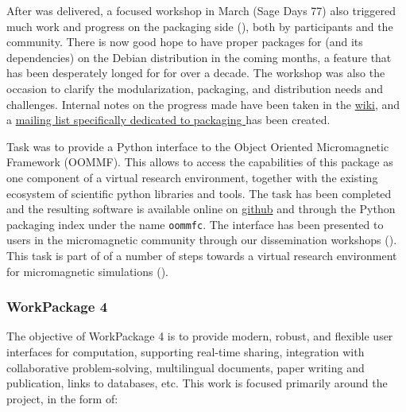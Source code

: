 \documentclass{deliverablereport}
\begin{document}
  After  was delivered, a focused
  workshop in March (Sage Days 77) also triggered much work and progress on the packaging
  side (), both by \ODK participants and
  the community. There is now good hope to have proper packages for \Sage (and its
  dependencies) on the Debian distribution in the coming months, a feature that has been
  desperately longed for for over a decade.  The workshop was also the occasion to clarify
  the modularization, packaging, and distribution needs and challenges. Internal notes on
  the progress made have been taken in the
  \href{https://wiki.sagemath.org/days77/packaging}{\Sage wiki}, and a
  \href{https://groups.google.com/forum/#!forum/sage-packaging}{mailing list specifically
    dedicated to packaging \Sage} has been created.

  Task  was to
  provide a Python interface to the Object Oriented Micromagnetic Framework
  (OOMMF). This allows to access the capabilities of this package as one
  component of a virtual research environment, together with the existing
  ecosystem of scientific python libraries and tools. The task has been
  completed and the resulting software is available online on
  \href{https://github.com/joommf/oommfc}{github} and through the Python
  packaging index under the name \texttt{oommfc}. The interface has been presented to users in the
  micromagnetic community through our dissemination workshops 
  (). This task is part of of a
  number of steps towards a virtual research environment for micromagnetic
  simulations ().

\subsubsection{WorkPackage 4}

The objective of WorkPackage 4 is to provide modern, robust, and flexible user interfaces for
computation, supporting real-time sharing, integration with collaborative problem-solving,
multilingual documents, paper writing and publication, links to databases, etc. This work is focused primarily around the \Jupyter project, in the form of:
\end{document}
